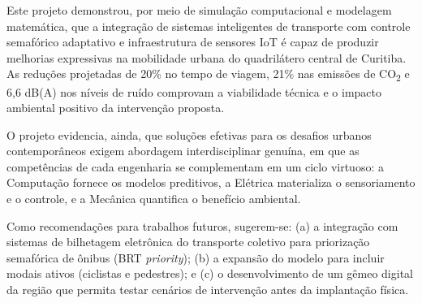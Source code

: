 \documentclass[12pt,a4paper,oneside]{abntex2}
\begin{document}
Este projeto demonstrou, por meio de simulação computacional e modelagem matemática, que a integração de sistemas inteligentes de transporte com controle semafórico adaptativo e infraestrutura de sensores IoT é capaz de produzir melhorias expressivas na mobilidade urbana do quadrilátero central de Curitiba. As reduções projetadas de 20\% no tempo de viagem, 21\% nas emissões de CO\textsubscript{2} e 6,6 dB(A) nos níveis de ruído comprovam a viabilidade técnica e o impacto ambiental positivo da intervenção proposta.

O projeto evidencia, ainda, que soluções efetivas para os desafios urbanos contemporâneos exigem abordagem interdisciplinar genuína, em que as competências de cada engenharia se complementam em um ciclo virtuoso: a Computação fornece os modelos preditivos, a Elétrica materializa o sensoriamento e o controle, e a Mecânica quantifica o benefício ambiental.

Como recomendações para trabalhos futuros, sugerem-se: (a) a integração com sistemas de bilhetagem eletrônica do transporte coletivo para priorização semafórica de ônibus (BRT \textit{priority}); (b) a expansão do modelo para incluir modais ativos (ciclistas e pedestres); e (c) o desenvolvimento de um gêmeo digital da região que permita testar cenários de intervenção antes da implantação física.
\end{document}
